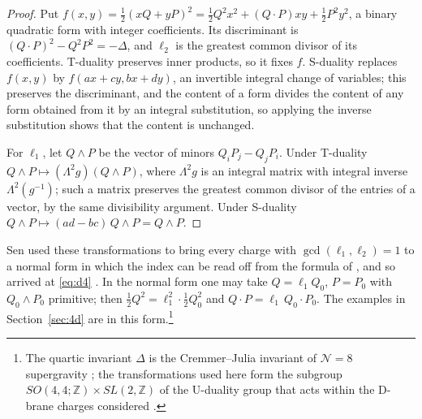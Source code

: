 \documentclass[11pt]{amsart}
\theoremstyle{definition}
\newcommand{\ZZ}{\mathbb{Z}}
\begin{document}
\begin{proof}
Put $f(x,y)=\frac12(xQ+yP)^2=\frac12Q^2x^2+(Q\cdot P)xy+\frac12P^2y^2$, a binary quadratic form with integer coefficients. Its discriminant is $(Q\cdot P)^2-Q^2P^2=-\Delta$, and $\ell_2$ is the greatest common divisor of its coefficients. T-duality preserves inner products, so it fixes $f$. S-duality replaces $f(x,y)$ by $f(ax+cy,bx+dy)$, an invertible integral change of variables; this preserves the discriminant, and the content of a form divides the content of any form obtained from it by an integral substitution, so applying the inverse substitution shows that the content is unchanged.

For $\ell_1$, let $Q\wedge P$ be the vector of minors $Q_iP_j-Q_jP_i$. Under T-duality $Q\wedge P\mapsto(\Lambda^2g)(Q\wedge P)$, where $\Lambda^2g$ is an integral matrix with integral inverse $\Lambda^2(g^{-1})$; such a matrix preserves the greatest common divisor of the entries of a vector, by the same divisibility argument. Under S-duality $Q\wedge P\mapsto(ad-bc)\,Q\wedge P=Q\wedge P$.
\end{proof}

Sen used these transformations to bring every charge with $\gcd(\ell_1,\ell_2)=1$ to a normal form in which the index can be read off from the formula of \cite{MMS99,SSY06}, and so arrived at \eqref{eq:d4} \cite[\S2, App.~A]{Sen10}. In the normal form one may take $Q=\ell_1Q_0$, $P=P_0$ with $Q_0\wedge P_0$ primitive; then $\frac12Q^2=\ell_1^2\cdot\frac12Q_0^2$ and $Q\cdot P=\ell_1\,Q_0\cdot P_0$. The examples in Section~\ref{sec:4d} are in this form.\footnote{The quartic invariant $\Delta$ is the Cremmer--Julia invariant of $\mathcal N=8$ supergravity \cite{CJ79,KK96}; the transformations used here form the subgroup $SO(4,4;\ZZ)\times SL(2,\ZZ)$ of the U-duality group that acts within the D-brane charges considered \cite[\S2]{Sen10}.}
\end{document}
